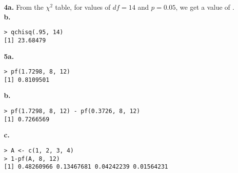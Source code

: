 \documentclass[12pt]{report}
\begin{document}
\noindent \textbf{4a.} From the $\chi^2$ table, for values of $df = 14$ and $p = 0.05$, we get a value of .\\

\noindent \textbf{b.} 
\begin{verbatim}
> qchisq(.95, 14)
[1] 23.68479
\end{verbatim}

\noindent \textbf{5a.} 
\begin{verbatim}
> pf(1.7298, 8, 12)
[1] 0.8109501
\end{verbatim}

\noindent \textbf{b.}
\begin{verbatim}
> pf(1.7298, 8, 12) - pf(0.3726, 8, 12)
[1] 0.7266569
\end{verbatim}

\noindent \textbf{c.}
\begin{verbatim}
> A <- c(1, 2, 3, 4)
> 1-pf(A, 8, 12)
[1] 0.48260966 0.13467681 0.04242239 0.01564231
\end{verbatim}
\end{document}
